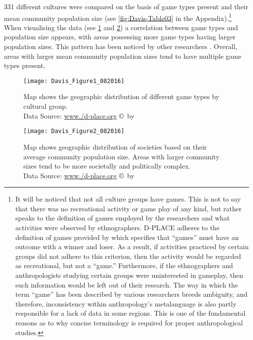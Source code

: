 331 different cultures were compared on the basis of game types present and their mean community population size (see \cref{fig:Davis-Table03} in the Appendix).\footnote{It will be noticed that not all culture groups have games. This is not to say that there was no recreational activity or game play of any kind, but rather speaks to the definition of games employed by the researchers and what activities were observed by ethnographers. D-PLACE adheres to the definition of games provided by \textcite{roberts1959} which specifies that ``games” must have an outcome with a winner and loser. As a result, if activities practiced by certain groups did not adhere to this criterion, then the activity would be regarded as recreational, but not a ``game.” Furthermore, if the ethnographers and anthropologists studying certain groups were uninterested in gameplay, then such information would be left out of their research. The way in which the term ``game” has been described by various researchers breeds ambiguity, and therefore, inconsistency within anthropology’s metalanguage is also partly responsible for a lack of data in some regions. This is one of the fundamental reasons as to why concise terminology is required for proper anthropological studies.} When visualising the data (see \cref{fig:Figure1_Davis_082016} and \cref{fig:Figure2_Davis_082016}) a correlation between game types and population size appears, with areas possessing more game types having larger population sizes. This pattern has been noticed by other researchers \parencites{ball1972}[322]{chick1984}[195]{chick1998}{roberts1959}. Overall, areas with larger mean community population sizes tend to have multiple game types present.

\begin{figure}[!htb] %
	\centering
	\texttt{[image: Davis\_Figure1\_082016]}
	\caption{Map shows the geographic distribution of different game types by cultural group.
	{\normalfont\scriptsize \\ Data Source: \href{http:/www./d-place.org}{www./d-place.org} \copyright\ by 
                 \shortauthor
                  }}
	\label{fig:Figure1_Davis_082016}
\end{figure}

\begin{figure}[!htb] %
	\centering
	\texttt{[image: Davis\_Figure2\_082016]}
	\caption{Map shows geographic distribution of societies based on their average community population size. Areas with larger community sizes tend to be more societally and politically complex.
	{\normalfont\scriptsize \\ Data Source: \href{http:/www./d-place.org}{www./d-place.org} \copyright\ by 
                 \shortauthor
                  }}
	\label{fig:Figure2_Davis_082016}
\end{figure}

